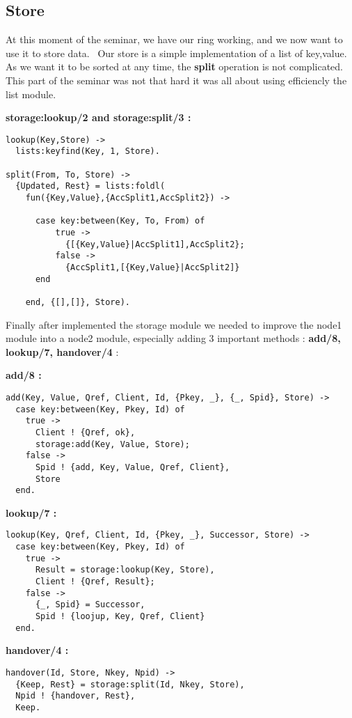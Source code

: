\documentclass[a4paper, 11pt]{article}
\begin{document}
\subsection{Store}

At this moment of the seminar, we have our ring working, and we now want to use it to store data. \
Our store is a simple implementation of a list of key,value. As we want it to be sorted at any time, the \textbf{split} operation is not complicated. This part of the seminar was not that hard it was all about using efficiencly the list module. \

\textbf{storage:lookup/2 and storage:split/3 : }

\begin{verbatim}
lookup(Key,Store) ->
  lists:keyfind(Key, 1, Store).

split(From, To, Store) ->
  {Updated, Rest} = lists:foldl(
    fun({Key,Value},{AccSplit1,AccSplit2}) ->
      
      case key:between(Key, To, From) of
          true ->
            {[{Key,Value}|AccSplit1],AccSplit2};
          false ->
            {AccSplit1,[{Key,Value}|AccSplit2]}
      end

    end, {[],[]}, Store).
\end{verbatim}

Finally after implemented the storage module we needed to improve the node1 module into a node2 module, especially adding 3 important methods : \textbf{add/8, lookup/7, handover/4} :

\textbf{add/8 :}

\begin{verbatim}
add(Key, Value, Qref, Client, Id, {Pkey, _}, {_, Spid}, Store) ->
  case key:between(Key, Pkey, Id) of
    true ->
      Client ! {Qref, ok},
      storage:add(Key, Value, Store);
    false ->
      Spid ! {add, Key, Value, Qref, Client},
      Store
  end.
\end{verbatim}

\textbf{lookup/7 :}

\begin{verbatim}
lookup(Key, Qref, Client, Id, {Pkey, _}, Successor, Store) ->
  case key:between(Key, Pkey, Id) of
    true ->
      Result = storage:lookup(Key, Store),
      Client ! {Qref, Result};
    false ->
      {_, Spid} = Successor,
      Spid ! {loojup, Key, Qref, Client}
  end.
\end{verbatim}

\textbf{handover/4 :}

\begin{verbatim}
handover(Id, Store, Nkey, Npid) ->
  {Keep, Rest} = storage:split(Id, Nkey, Store),
  Npid ! {handover, Rest},
  Keep.
\end{verbatim}
\end{document}
